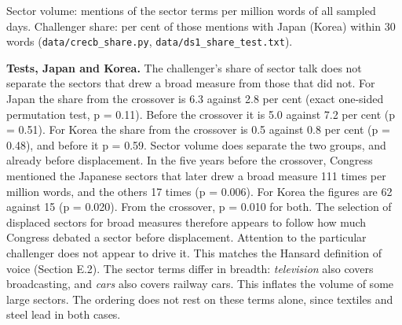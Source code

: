 Sector volume: mentions of the sector terms per million words of all
sampled days. Challenger share: per cent of those mentions with Japan
(Korea) within 30 words (\texttt{data/\allowbreak{}crecb\_\allowbreak{}share.py},
\texttt{data/\allowbreak{}ds1\_\allowbreak{}share\_\allowbreak{}test.txt}).

\textbf{Tests, Japan and Korea.} The challenger's share of sector talk
does not separate the sectors that drew a broad measure from those that
did not. For Japan the share from the crossover is 6.3 against 2.8 per
cent (exact one-sided permutation test, p = 0.11). Before the crossover
it is 5.0 against 7.2 per cent (p = 0.51). For Korea the share from the
crossover is 0.5 against 0.8 per cent (p = 0.48), and before it p =
0.59. Sector volume does separate the two groups, and already before
displacement. In the five years before the crossover, Congress mentioned
the Japanese sectors that later drew a broad measure 111 times per
million words, and the others 17 times (p = 0.006). For Korea the
figures are 62 against 15 (p = 0.020). From the crossover, p = 0.010 for
both. The selection of displaced sectors for broad measures therefore
appears to follow how much Congress debated a sector before
displacement. Attention to the particular challenger does not appear to
drive it. This matches the Hansard definition of voice (Section E.2).
The sector terms differ in breadth: \emph{television} also covers
broadcasting, and \emph{cars} also covers railway cars. This inflates
the volume of some large sectors. The ordering does not rest on these
terms alone, since textiles and steel lead in both cases.

